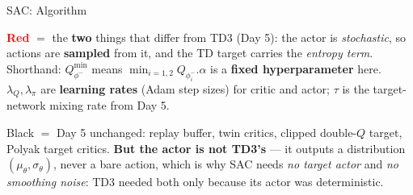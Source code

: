 \begin{frame}{SAC: Algorithm}
\begin{center}
{\scriptsize\textbf{\textcolor{red}{Red}} $=$ the \textbf{two} things that differ from TD3 (Day 5): the actor is \emph{stochastic}, so actions are \textbf{sampled} from it, and the TD target carries the \emph{entropy term}.\\
Shorthand: $Q^{\min}_{\phi^{-}}$ means $\min_{i=1,2} Q_{\phi^{-}_i}$.\quad $\alpha$ is a \textbf{fixed hyperparameter} here.\quad
$\lambda_Q,\lambda_\pi$ are \textbf{learning rates} (Adam step sizes) for critic and actor; $\tau$ is the target-network mixing rate from Day 5.}
\end{center}
\begin{center}
\end{center}
\vspace{-0.2em}
{\scriptsize Black $=$ Day 5 unchanged: replay buffer, twin critics, clipped double-$Q$ target, Polyak target critics. \textbf{But the actor is not TD3's} --- it outputs a distribution $(\mu_\theta,\sigma_\theta)$, never a bare action, which is why SAC needs \emph{no target actor} and \emph{no smoothing noise}: TD3 needed both only because its actor was deterministic.}
\end{frame}
